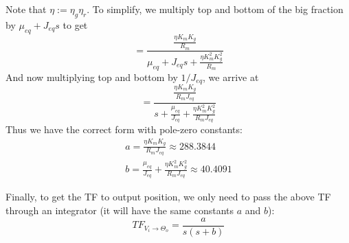 \begin{enumerate}
\begin{solposcon}
\begin{equation}
        \end{equation}
        Note that $\eta := \eta_g \eta_r$.  To simplify, we multiply top and bottom of the big fraction by $\mu_{eq} + J_{eq}s$ to get
        \begin{equation}
            = \frac{
                    \frac{
                            \eta K_m K_g
                            }{
                            R_m
                            }
                    }{
                    \mu_{eq} + J_{eq}s + \frac{
                                                \eta K_m^2 K_g^2
                                                }{
                                                R_m
                                                }
                    }
        \end{equation}
        And now multiplying top and bottom by $1/J_{eq}$, we arrive at
        \begin{equation}
            = \frac{
                    \frac{
                            \eta K_m K_g
                            }{
                            R_m J_{eq}
                            }
                    }{
                    s + \frac{
                                \mu_{eq}
                                }{
                                J_{eq}
                                }
                    + \frac{
                            \eta K_m^2 K_g^2
                            }{
                            R_m J_{eq}
                            }
                    }
        \end{equation}
        Thus we have the correct form with pole-zero constants:
        \begin{subequations}
        \begin{gather}
            a = \frac{\eta K_m K_g}{R_m J_{eq}} \approx 288.3844\\
            b = \frac{\mu_{eq}}{J_{eq}} + \frac{\eta K_m^2 K_g^2}{R_m J_{eq}}
                \approx 40.4091
        \end{gather}
        \end{subequations}
        \par
        Finally, to get the TF to output position, we only need to pass the above TF through an integrator (it will have the same constants $a$ and $b$):
        \begin{equation}
            TF_{V_i\to\Theta_o} =
                \frac{a}{s(s+b)}
        \end{equation}
    \end{solposcon}

\end{enumerate}
